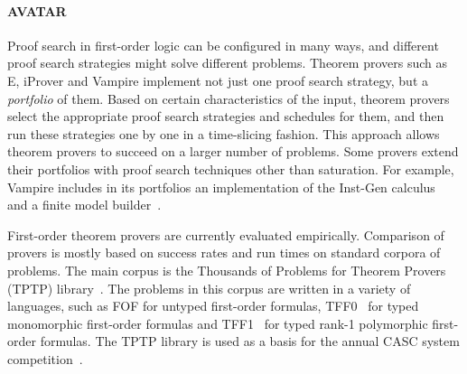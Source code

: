 \paragraph{AVATAR}

Proof search in first-order logic can be configured in many ways, and different proof search strategies might solve different problems. Theorem provers such as E, iProver and Vampire implement not just one proof search strategy, but a \emph{portfolio} of them. Based on certain characteristics of the input, theorem provers select the appropriate proof search strategies and schedules for them, and then run these strategies one by one in a time-slicing fashion. This approach allows theorem provers to succeed on a larger number of problems. Some provers extend their portfolios with proof search techniques other than saturation. For example, Vampire includes in its portfolios an implementation of the Inst-Gen calculus~\cite{DBLP:conf/birthday/Korovin13} and a finite model builder~\cite{VampireFMB}.

First-order theorem provers are currently evaluated empirically. Comparison of provers is mostly based on success rates and run times on standard corpora of problems. The main corpus is the Thousands of Problems for Theorem Provers (TPTP) library~\cite{TPTP}. The problems in this corpus are written in a variety of languages, such as FOF for untyped first-order formulas, TFF0~\cite{tff0} for typed monomorphic first-order formulas and TFF1~\cite{tff1} for typed rank-1 polymorphic first-order formulas. The TPTP library is used as a basis for the annual CASC system competition~\cite{CASC}.

